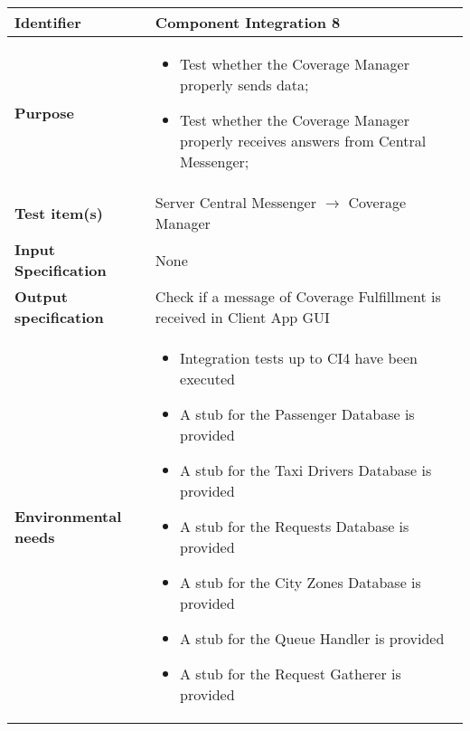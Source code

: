 \begin{center}
\begin{tabular}{lp{}}
\toprule
\textbf{Identifier}		&	Component Integration 8\\
\midrule
\textbf{Purpose}		&	\begin{itemize}
					\item Test whether the Coverage Manager properly sends data;
					\item Test whether the Coverage Manager properly receives answers from Central Messenger;
					\end{itemize}	\\
\textbf{Test item(s)}	&	Server Central Messenger $\rightarrow$ Coverage Manager\\
\textbf{Input Specification}	&	None\\
\textbf{Output specification}	&	Check if a message of Coverage Fulfillment is received in Client App GUI\\
\textbf{Environmental needs}	&	\begin{itemize}
							\item Integration tests up to CI4 have been executed
							\item A stub for the Passenger Database is provided
							\item A stub for the Taxi Drivers Database is provided
							\item A stub for the Requests Database is provided
							\item A stub for the City Zones Database is provided
							\item A stub for the Queue Handler is provided
							\item A stub for the Request Gatherer is provided
							\end{itemize}	\\
\bottomrule
\end{tabular}
\end{center}




